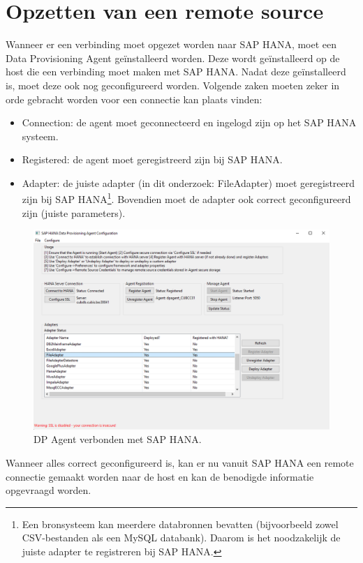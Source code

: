 \section{Opzetten van een remote source}
Wanneer er een verbinding moet opgezet worden naar SAP HANA, moet een Data Provisioning Agent geïnstalleerd worden. Deze wordt geïnstalleerd op de host die een verbinding moet maken met SAP HANA. Nadat deze geïnstalleerd is, moet deze ook nog geconfigureerd worden. Volgende zaken moeten zeker in orde gebracht worden voor een connectie kan plaats vinden: 
\begin{itemize}
	\item Connection: de agent moet geconnecteerd en ingelogd zijn op het SAP HANA systeem.
	\item Registered: de agent moet geregistreerd zijn bij SAP HANA.
	\item Adapter: de juiste adapter (in dit onderzoek: FileAdapter) moet geregistreerd zijn bij SAP HANA\footnote[1]{Een bronsysteem kan meerdere databronnen bevatten (bijvoorbeeld zowel CSV-bestanden als een MySQL databank). Daarom is het noodzakelijk de juiste adapter te registreren bij SAP HANA.}. Bovendien moet de adapter ook correct geconfigureerd zijn (juiste parameters).
\end{itemize} 

\begin{figure}[h]
	\centering
	\includegraphics[scale=0.5]{../images/DPAgent.png}
	\caption{DP Agent verbonden met SAP HANA.}
	\label{fig:dpa}
\end{figure}

Wanneer alles correct geconfigureerd is, kan er nu vanuit SAP HANA een remote connectie gemaakt worden naar de host en kan de benodigde informatie opgevraagd worden.

